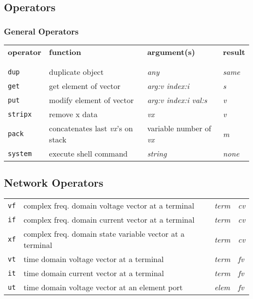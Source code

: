\subsection{Operators}


\subsubsection{General Operators}

\begin{tabular}{p{.8in}p{2.5in}p{1.0in}p{.75in}}
{\bf operator} & {\bf function} & {\bf argument(s)} & {\bf result} \\
\\
\\
{\tt dup} & duplicate object & {\it any} & {\it same} \\
{\tt get} & get element of vector & {\it arg:v \newline index:i} & {\it s} \\
{\tt put} & modify element of vector & {\it arg:v \newline index:i \newline
  val:s} & {\it v} \\
{\tt stripx} & remove x data & {\it vx} & {\it v} \\
{\tt pack} & concatenates last {\it vx}'s on stack & variable number of {\it vx} & {\it m} \\
{\tt system} & execute shell command & {\it string} & {\it none}
\end{tabular}

\subsection{Network Operators}

\begin{tabular}{p{.8in}p{2.5in}p{1.0in}p{.75in}}
{\tt vf} & complex freq. domain voltage vector at a terminal &
    {\it term} & {\it cv} \\
{\tt if} & complex freq. domain current vector at a terminal &
    {\it term} & {\it cv} \\
{\tt xf} & complex freq. domain state variable vector at a terminal &
    {\it term} & {\it cv} \\
{\tt vt} & time domain voltage vector at a terminal &
    {\it term} & {\it fv} \\
{\tt it} & time domain current vector at a terminal &
    {\it term} & {\it fv} \\
{\tt ut} & time domain voltage vector at an element port &
    {\it elem} & {\it fv} \\
\end{tabular}

